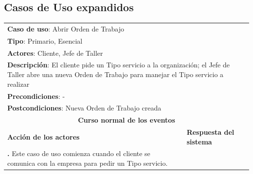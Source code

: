 \documentclass[12pt]{extarticle}
\begin{document}
\begin{spacing}{1.2}
    

    \subsection{Casos de Uso expandidos}

    \newcommand\inc{\stepcounter{step}\textbf{\thestep. }}
    \newcommand\resetinc{\setcounter{step}{0}}
    
    \newcommand\raya{\noindent\rule{169mm}{0.8mm}\\}

    \begin{longtable}{ |p{8cm}|p{8cm}| }
        \hline
        \multicolumn{2}{|p{16cm}|}{\textbf{Caso de uso}: Abrir Orden de Trabajo}\\
        \multicolumn{2}{|p{16cm}|}{\textbf{Tipo}: Primario, Esencial}\\
        \multicolumn{2}{|p{16cm}|}{\textbf{Actores}: Cliente, Jefe de Taller}\\
        \multicolumn{2}{|p{16cm}|}{\textbf{Descripción}: El cliente pide un Tipo servicio a la organización; el Jefe de Taller abre una nueva Orden de Trabajo para manejar el Tipo servicio a realizar}\\
        \multicolumn{2}{|p{16cm}|}{\textbf{Precondiciones}: -}\\
        \multicolumn{2}{|p{16cm}|}{\textbf{Postcondiciones}: Nueva Orden de Trabajo creada}\\
        \hline
        \multicolumn{2}{|c|}{\textbf{Curso normal de los eventos}}\\
        \hline
        \textbf{Acción de los actores} & \textbf{Respuesta del sistema}\\
        \hline
            \inc Este caso de uso comienza cuando el cliente se comunica con la empresa para pedir un Tipo servicio. & \\
            \hline


\end{longtable}
\end{spacing}
\end{document}
